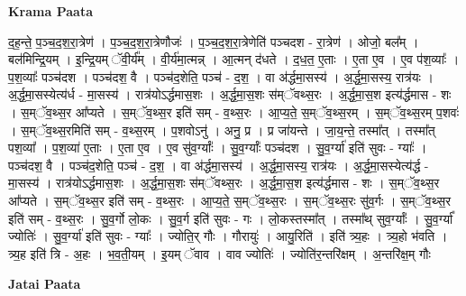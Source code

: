 \documentclass[17pt]{extarticle}
\begin{document}
\textbf{Krama Paata} \newline

द॒ह॒न्ते॒ प॒ञ्च॒द॒श॒रा॒त्रेण॑ । प॒ञ्च॒द॒श॒रा॒त्रेणौजः॑ । प॒ञ्च॒द॒श॒रा॒त्रेणेति॑ पञ्चदश - रा॒त्रेण॑ । ओजो॒ बल᳚म् । बल॑मिन्द्रि॒यम् । इ॒न्द्रि॒यम् ॅवी॒र्य᳚म् । वी॒र्य॑मा॒त्मन्न् । आ॒त्मन् द॑धते । द॒ध॒त॒ ए॒ताः । ए॒ता ए॒व । ए॒व प॑श॒व्याः᳚ । प॒श॒व्याः᳚ पञ्च॑दश । पञ्च॑दश॒ वै । पञ्च॑द॒शेति॒ पञ्च॑ - द॒श॒ । वा अ॑र्द्धमा॒सस्य॑ । अ॒र्द्ध॒मा॒सस्य॒ रात्र॑यः । अ॒र्द्ध॒मा॒सस्येत्य॑र्ध - मा॒सस्य॑ । रात्र॑योऽर्द्धमास॒शः । अ॒र्द्ध॒मा॒स॒शः स॑म्ॅवथ्स॒रः । अ॒र्द्ध॒मा॒स॒श इत्य॑र्द्धमास - शः । स॒म्ॅव॒थ्स॒र आ᳚प्यते । स॒म्ॅव॒थ्स॒र इति॑ सम् - व॒थ्स॒रः । आ॒प्य॒ते॒ स॒म्ॅव॒थ्स॒रम् । स॒म्ॅव॒थ्स॒रम् प॒शवः॑ । स॒म्ॅव॒थ्स॒रमिति॑ सम् - व॒थ्स॒रम् । प॒शवोऽनु॑ । अनु॒ प्र । प्र जा॑यन्ते । जा॒य॒न्ते॒ तस्मा᳚त् । तस्मा᳚त् पश॒व्या᳚ । प॒श॒व्या॑ ए॒ताः । ए॒ता ए॒व । ए॒व सु॑व॒र्ग्याः᳚ । सु॒व॒र्ग्याः᳚ पञ्च॑दश । सु॒व॒र्ग्या॑ इति॑ सुवः - ग्याः᳚ । पञ्च॑दश॒ वै । पञ्च॑द॒शेति॒ पञ्च॑ - द॒श॒ । वा अ॑र्द्धमा॒सस्य॑ । अ॒र्द्ध॒मा॒सस्य॒ रात्र॑यः । अ॒र्द्ध॒मा॒सस्येत्य॑र्द्ध - मा॒सस्य॑ । रात्र॑योऽर्द्धमास॒शः । अ॒र्द्ध॒मा॒स॒शः स॑म्ॅवथ्स॒रः । अ॒र्द्ध॒मा॒स॒श इत्य॑र्द्धमास - शः । स॒म्ॅव॒थ्स॒र आ᳚प्यते । स॒म्ॅव॒थ्स॒र इति॑ सम् - व॒थ्स॒रः । आ॒प्य॒ते॒ स॒म्ॅव॒थ्स॒रः । स॒म्ॅव॒थ्स॒रः सु॑व॒र्गः । स॒म्ॅव॒थ्स॒र इति॑ सम् - व॒थ्स॒रः । सु॒व॒र्गो लो॒कः । सु॒व॒र्ग इति॑ सुवः - गः । लो॒कस्तस्मा᳚त् । तस्मा᳚थ् सुव॒र्ग्याः᳚ । सु॒व॒र्ग्या᳚ ज्योतिः॑ । सु॒व॒र्ग्या॑ इति॑ सुवः - ग्याः᳚ । ज्योति॒र् गौः । गौरायुः॑ । आयु॒रिति॑ । इति॑ त्र्य॒हः । त्र्य॒हो भ॑वति । त्र्य॒ह इति॑ त्रि - अ॒हः । भ॒व॒ती॒यम् । इ॒यम् ॅवाव । वाव ज्योतिः॑ । ज्योति॑र॒न्तरि॑क्षम् । अ॒न्तरि॑क्ष॒म् गौः \newline

\textbf{Jatai Paata} \newline
\end{document}
